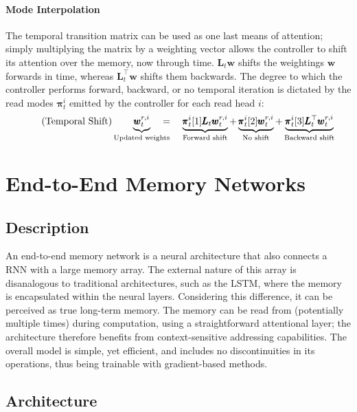 \documentclass[]{article}
\begin{document}
\paragraph{Mode Interpolation} The temporal transition matrix can be used as one last means of attention; simply multiplying the matrix by a weighting vector allows the controller to shift its attention over the memory, now through time. $\pmb{L}_t \pmb{w}$ shifts the weightings $\pmb{w}$ forwards in time, whereas $\pmb{L}_t^\top \pmb{w}$ shifts them backwards. The degree to which the controller performs forward, backward, or no temporal iteration is dictated by the read modes $\pmb{\pi}_t^i$ emitted by the controller for each read head $i$:
\[
\tag{Temporal Shift}
\underbrace{\pmb{w}_t^{r,i}}_{\text{\scriptsize Updated weights}} \hspace{-10pt} = \quad
\underbrace{\pmb{\pi}_t^i[1] \pmb{L}_t\pmb{w}_t^{r,i}}_{\text{\scriptsize Forward shift}} + 
\underbrace{\pmb{\pi}_t^i[2] \pmb{w}_t^{r,i}}_{\text{\scriptsize No shift}} + 
\underbrace{\pmb{\pi}_t^i[3] \pmb{L}_t^\top \pmb{w}_t^{r,i}}_{\text{\scriptsize Backward shift}}
\]

\section{End-to-End Memory Networks}
\label{E2E}
\subsection{Description}
An end-to-end memory network is a neural architecture that also connects a RNN with a large memory array. The external nature of this array is disanalogous to traditional architectures, such as the LSTM, where the memory is encapsulated within the neural layers. Considering this difference, it can be perceived as true long-term memory. The memory can be read from (potentially multiple times) during computation, using a straightforward attentional layer; the architecture therefore benefits from context-sensitive addressing capabilities. The overall model is simple, yet efficient, and includes no discontinuities in its operations, thus being trainable with gradient-based methods.

\subsection{Architecture}
\end{document}
